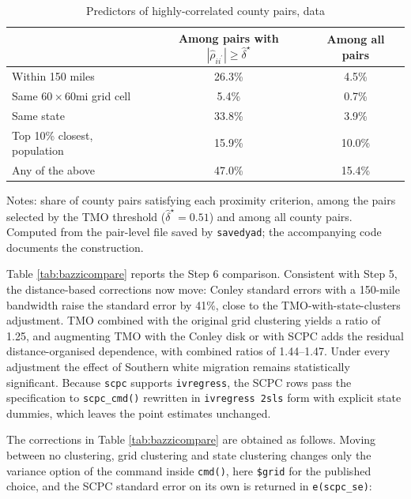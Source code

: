 \documentclass[varwidth,bib]{statapress}
\begin{document}
\begin{table}[H]
\centering
\caption{Predictors of highly-correlated county pairs, \citet{Bazzietal2023} data}
\label{tab:bazzipredictors}
\begin{threeparttable}
\begin{tabular}{lcc}
\toprule
 & Among pairs with $|\hat\rho_{ii^\prime}|\geq\hat\delta^\star$ & Among all pairs \\
\midrule
Within 150 miles              & 26.3\% & 4.5\%  \\
Same $60\times 60$mi grid cell & 5.4\%  & 0.7\%  \\
Same state                    & 33.8\% & 3.9\%  \\
Top 10\% closest, population  & 15.9\% & 10.0\% \\
Any of the above              & 47.0\% & 15.4\% \\
\bottomrule
\end{tabular}
\begin{tablenotes}[flushleft]
\setlength{}\scriptsize
\item Notes: share of county pairs satisfying each proximity criterion, among the pairs selected by the TMO threshold ($\hat\delta^\star=0.51$) and among all county pairs.  Computed from the pair-level file saved by {\tt savedyad}; the accompanying code documents the construction.
\end{tablenotes}
\end{threeparttable}
\end{table}

Table \ref{tab:bazzicompare} reports the Step 6 comparison.  Consistent with Step 5, the distance-based corrections now move: Conley standard errors with a 150-mile bandwidth raise the standard error by 41\%, close to the TMO-with-state-clusters adjustment.  TMO combined with the original grid clustering yields a ratio of 1.25, and augmenting TMO with the Conley disk or with SCPC adds the residual distance-organised dependence, with combined ratios of 1.44--1.47.  Under every adjustment the effect of Southern white migration remains statistically significant.  Because {\tt scpc} supports {\tt ivregress}, the SCPC rows pass the specification to {\tt scpc\_cmd()} rewritten in {\tt ivregress 2sls} form with explicit state dummies, which leaves the point estimates unchanged.

The corrections in Table \ref{tab:bazzicompare} are obtained as follows.  Moving between no clustering, grid clustering and state clustering changes only the variance option of the command inside {\tt cmd()}, here {\tt \$grid} for the published choice, and the SCPC standard error on its own is returned in {\tt e(scpc\_se)}:
\end{document}
